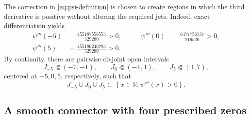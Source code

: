\documentclass[11pt,reqno]{amsart}
\theoremstyle{definition}
\newcommand{\R}{\mathbb{R}}
\newcommand{\set}[1]{\left\{#1\right\}}
\begin{document}
The correction in \cref{eq:psi-definition} is chosen to create regions in
which the third derivative is positive without altering the required jets.
Indeed, exact differentiation yields
\begin{equation}
  \begin{aligned}
    \psi'''(-5)&=\frac{455187556553}{329280}>0,
    &\qquad
    \psi'''(0)&=\frac{6477756737}{219520}>0,\\
    \psi'''(5)&=\frac{455186246783}{329280}>0.
  \end{aligned}
  \label{eq:positive-third-derivatives}
\end{equation}
By continuity, there are pairwise disjoint open intervals
\begin{equation}
  J_{-5}\Subset(-7,-1),
  \qquad
  J_0\Subset(-1,1),
  \qquad
  J_5\Subset(1,7),
  \label{eq:J-intervals}
\end{equation}
centered at $-5,0,5$, respectively, such that
\begin{equation}
  \overline{J_{-5}}\cup\overline{J_0}\cup\overline{J_5}
  \subset\set{x\in\R:\psi'''(x)>0}.
  \label{eq:J-positive}
\end{equation}

\subsection{A smooth connector with four prescribed zeros}
\end{document}
